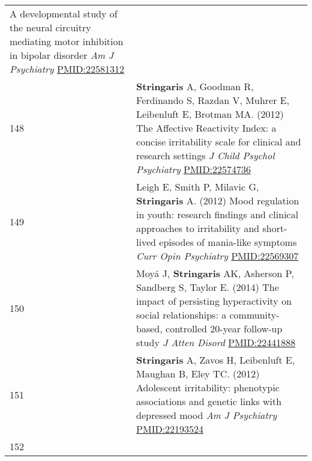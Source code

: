 \documentclass[
]{article}
\begin{document}
\begin{longtable}[]{@{}ll@{}}
\begin{minipage}[t]{0.94\columnwidth}
A developmental study of the neural circuitry mediating motor inhibition
in bipolar disorder \emph{Am J Psychiatry} \url{PMID:22581312}\strut
\end{minipage}\tabularnewline
\begin{minipage}[t]{0.01\columnwidth}\raggedright
148\strut
\end{minipage} & \begin{minipage}[t]{0.94\columnwidth}\raggedright
\textbf{Stringaris} A, Goodman R, Ferdinando S, Razdan V, Muhrer E,
Leibenluft E, Brotman MA. (2012) The Affective Reactivity Index: a
concise irritability scale for clinical and research settings \emph{J
Child Psychol Psychiatry} \url{PMID:22574736}\strut
\end{minipage}\tabularnewline
\begin{minipage}[t]{0.01\columnwidth}\raggedright
149\strut
\end{minipage} & \begin{minipage}[t]{0.94\columnwidth}\raggedright
Leigh E, Smith P, Milavic G, \textbf{Stringaris} A. (2012) Mood
regulation in youth: research findings and clinical approaches to
irritability and short-lived episodes of mania-like symptoms \emph{Curr
Opin Psychiatry} \url{PMID:22569307}\strut
\end{minipage}\tabularnewline
\begin{minipage}[t]{0.01\columnwidth}\raggedright
150\strut
\end{minipage} & \begin{minipage}[t]{0.94\columnwidth}\raggedright
Moyá J, \textbf{Stringaris} AK, Asherson P, Sandberg S, Taylor E. (2014)
The impact of persisting hyperactivity on social relationships: a
community-based, controlled 20-year follow-up study \emph{J Atten
Disord} \url{PMID:22441888}\strut
\end{minipage}\tabularnewline
\begin{minipage}[t]{0.01\columnwidth}\raggedright
151\strut
\end{minipage} & \begin{minipage}[t]{0.94\columnwidth}\raggedright
\textbf{Stringaris} A, Zavos H, Leibenluft E, Maughan B, Eley TC. (2012)
Adolescent irritability: phenotypic associations and genetic links with
depressed mood \emph{Am J Psychiatry} \url{PMID:22193524}\strut
\end{minipage}\tabularnewline
\begin{minipage}[t]{0.01\columnwidth}\raggedright
152\strut
\end{minipage} & \begin{minipage}[t]{0.94\columnwidth}\raggedright

\end{minipage}
\end{longtable}
\end{document}
